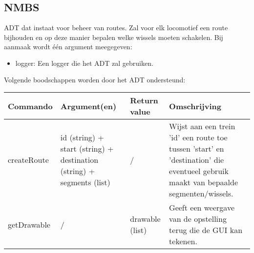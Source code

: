 \documentclass{article}
\begin{document}
\subsection{NMBS}
ADT dat instaat voor beheer van routes. Zal voor elk locomotief een route bijhouden en op deze manier bepalen welke wissels moeten schakelen. Bij aanmaak wordt \'{e}\'{e}n argument meegegeven:
\begin{itemize}
  \item logger: Een logger die het ADT zal gebruiken.
\end{itemize}
Volgende boodschappen worden door het ADT ondersteund:
\begin{center}
    \begin{tabular}{ | l | p{4cm} | l | p{6cm} |}
    \hline
    Commando & Argument(en) & Return value & Omschrijving \\ \hline
    createRoute & id (string) + start (string) + destination (string) + segments (list) & / & Wijst aan een trein 'id' een route toe tussen 'start' en 'destination' die eventueel gebruik maakt van bepaalde segmenten/wissels. \\ \hline
    getDrawable & / & drawable (list) & Geeft een weergave van de opstelling terug die de GUI kan tekenen. \\ \hline
    \end{tabular}
\end{center}
\end{document}
